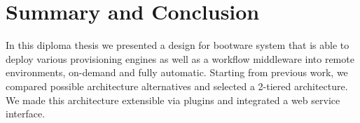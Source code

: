 \chapter{Summary and Conclusion}
\label{conclusion}

In this diploma thesis we presented a design for bootware system that is able to deploy various provisioning engines as well as a workflow middleware into remote environments, on-demand and fully automatic.
Starting from previous work, we compared possible architecture alternatives and selected a 2-tiered architecture.
We made this architecture extensible via plugins and integrated a web service interface.
